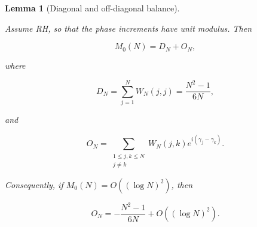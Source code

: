 \documentclass[11pt]{amsart}
\numberwithin{equation}{section}
\theoremstyle{plain}
\newtheorem{lemma}[theorem]{Lemma}
\theoremstyle{definition}
\theoremstyle{remark}
\begin{document}
\begin{lemma}[Diagonal and off-diagonal balance]
\label{lem:diagonal_off_diagonal_balance}

Assume RH, so that the phase increments have unit modulus. Then

\begin{equation}
M_0(N)=D_N+O_N,
\end{equation}

where

\begin{equation}
D_N
=
\sum_{j=1}^{N}W_N(j,j)
=
\frac{N^2-1}{6N},
\label{eq:diagonal_contribution_DN_RH}
\end{equation}

and

\begin{equation}
O_N
=
\sum_{\substack{1\le j,k\le N\\j\ne k}}
W_N(j,k)e^{i(\gamma_j-\gamma_k)}.
\label{eq:off_diagonal_contribution_ON_RH}
\end{equation}

Consequently, if
\(M_0(N)=O((\log N)^2)\), then

\begin{equation}
O_N
=
-
\frac{N^2-1}{6N}
+
O\!\left((\log N)^2\right).
\label{eq:off_diagonal_cancellation_law_RH}
\end{equation}

\end{lemma}
\end{document}
